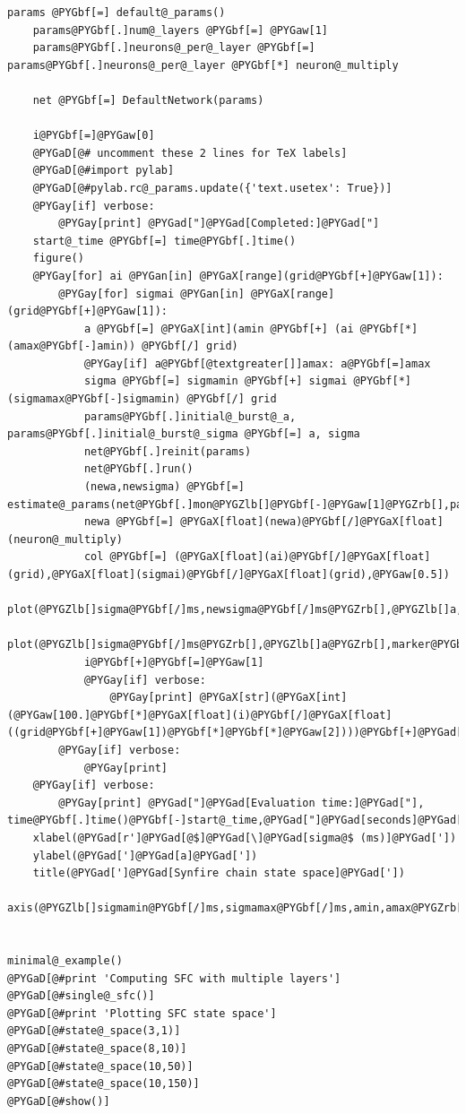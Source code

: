 \documentclass[letterpaper,10pt,english]{manual}
\begin{document}
\begin{Verbatim}[commandchars=@\[\]]
    params @PYGbf[=] default@_params()
    params@PYGbf[.]num@_layers @PYGbf[=] @PYGaw[1]
    params@PYGbf[.]neurons@_per@_layer @PYGbf[=] params@PYGbf[.]neurons@_per@_layer @PYGbf[*] neuron@_multiply

    net @PYGbf[=] DefaultNetwork(params)

    i@PYGbf[=]@PYGaw[0]
    @PYGaD[@# uncomment these 2 lines for TeX labels]
    @PYGaD[@#import pylab]
    @PYGaD[@#pylab.rc@_params.update({'text.usetex': True})]
    @PYGay[if] verbose:
        @PYGay[print] @PYGad["]@PYGad[Completed:]@PYGad["]
    start@_time @PYGbf[=] time@PYGbf[.]time()
    figure()
    @PYGay[for] ai @PYGan[in] @PYGaX[range](grid@PYGbf[+]@PYGaw[1]):
        @PYGay[for] sigmai @PYGan[in] @PYGaX[range](grid@PYGbf[+]@PYGaw[1]):
            a @PYGbf[=] @PYGaX[int](amin @PYGbf[+] (ai @PYGbf[*] (amax@PYGbf[-]amin)) @PYGbf[/] grid)
            @PYGay[if] a@PYGbf[@textgreater[]]amax: a@PYGbf[=]amax
            sigma @PYGbf[=] sigmamin @PYGbf[+] sigmai @PYGbf[*] (sigmamax@PYGbf[-]sigmamin) @PYGbf[/] grid
            params@PYGbf[.]initial@_burst@_a, params@PYGbf[.]initial@_burst@_sigma @PYGbf[=] a, sigma
            net@PYGbf[.]reinit(params)
            net@PYGbf[.]run()
            (newa,newsigma) @PYGbf[=] estimate@_params(net@PYGbf[.]mon@PYGZlb[]@PYGbf[-]@PYGaw[1]@PYGZrb[],params@PYGbf[.]initial@_burst@_t)
            newa @PYGbf[=] @PYGaX[float](newa)@PYGbf[/]@PYGaX[float](neuron@_multiply)
            col @PYGbf[=] (@PYGaX[float](ai)@PYGbf[/]@PYGaX[float](grid),@PYGaX[float](sigmai)@PYGbf[/]@PYGaX[float](grid),@PYGaw[0.5])
            plot(@PYGZlb[]sigma@PYGbf[/]ms,newsigma@PYGbf[/]ms@PYGZrb[],@PYGZlb[]a,newa@PYGZrb[],color@PYGbf[=]col)
            plot(@PYGZlb[]sigma@PYGbf[/]ms@PYGZrb[],@PYGZlb[]a@PYGZrb[],marker@PYGbf[=]@PYGad[']@PYGad[.]@PYGad['],color@PYGbf[=]col,markersize@PYGbf[=]@PYGaw[15])
            i@PYGbf[+]@PYGbf[=]@PYGaw[1]
            @PYGay[if] verbose:
                @PYGay[print] @PYGaX[str](@PYGaX[int](@PYGaw[100.]@PYGbf[*]@PYGaX[float](i)@PYGbf[/]@PYGaX[float]((grid@PYGbf[+]@PYGaw[1])@PYGbf[*]@PYGbf[*]@PYGaw[2])))@PYGbf[+]@PYGad["]@PYGad[@%]@PYGad["],
        @PYGay[if] verbose:
            @PYGay[print]
    @PYGay[if] verbose:
        @PYGay[print] @PYGad["]@PYGad[Evaluation time:]@PYGad["], time@PYGbf[.]time()@PYGbf[-]start@_time,@PYGad["]@PYGad[seconds]@PYGad["]
    xlabel(@PYGad[r']@PYGad[@$]@PYGad[\]@PYGad[sigma@$ (ms)]@PYGad['])
    ylabel(@PYGad[']@PYGad[a]@PYGad['])
    title(@PYGad[']@PYGad[Synfire chain state space]@PYGad['])
    axis(@PYGZlb[]sigmamin@PYGbf[/]ms,sigmamax@PYGbf[/]ms,amin,amax@PYGZrb[])


minimal@_example()
@PYGaD[@#print 'Computing SFC with multiple layers']
@PYGaD[@#single@_sfc()]
@PYGaD[@#print 'Plotting SFC state space']
@PYGaD[@#state@_space(3,1)]
@PYGaD[@#state@_space(8,10)]
@PYGaD[@#state@_space(10,50)]
@PYGaD[@#state@_space(10,150)]
@PYGaD[@#show()]
\end{Verbatim}
\end{document}
